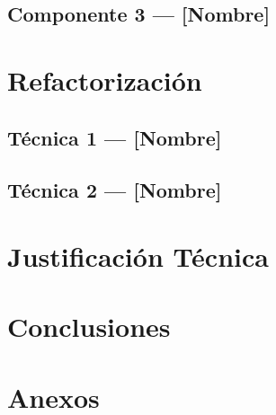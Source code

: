 \documentclass[12pt, a4paper]{article}
\begin{document}
\subsection{Componente 3 — [Nombre]}

\section{Refactorización}

\subsection{Técnica 1 — [Nombre]}

\subsection{Técnica 2 — [Nombre]}

\section{Justificación Técnica}

\section{Conclusiones}

\section{Anexos}
\end{document}
